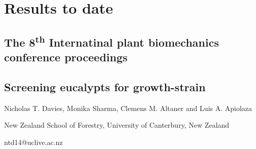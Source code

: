 \section{Results to date}
\subsection{ The 8\textsuperscript{th} Internatinal plant biomechanics conference proceedings}
\begin{center}
\subsection*{Screening eucalypts for growth-strain}

Nicholas T. Davies, Monika Sharma, Clemens M. Altaner and Luis A. Apiolaza

New Zealand School of Forestry, University of Canterbury, New Zealand

ntd14@uclive.ac.nz  
\end{center}

